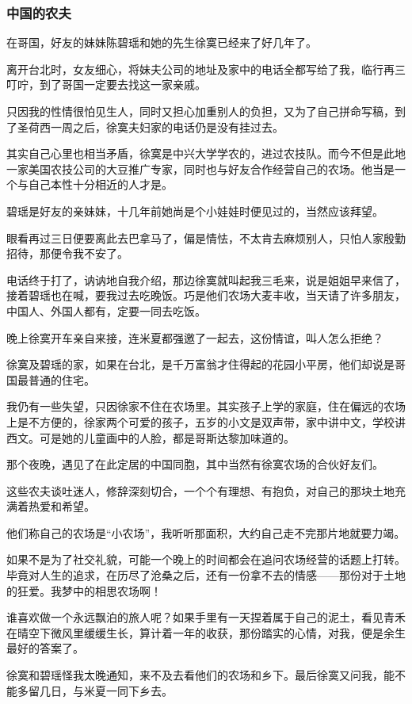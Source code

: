 \subsubsection*{中国的农夫}
\par 在哥国，好友的妹妹陈碧瑶和她的先生徐寞已经来了好几年了。
\par 离开台北时，女友细心，将妹夫公司的地址及家中的电话全都写给了我，临行再三叮咛，到了哥国一定要去找这一家亲戚。
\par 只因我的性情很怕见生人，同时又担心加重别人的负担，又为了自己拼命写稿，到了圣荷西一周之后，徐寞夫妇家的电话仍是没有挂过去。
\par 其实自己心里也相当矛盾，徐寞是中兴大学学农的，进过农技队。而今不但是此地一家美国农技公司的大豆推广专家，同时也与好友合作经营自己的农场。他当是一个与自己本性十分相近的人才是。
\par 碧瑶是好友的亲妹妹，十几年前她尚是个小娃娃时便见过的，当然应该拜望。
\par 眼看再过三日便要离此去巴拿马了，偏是情怯，不太肯去麻烦别人，只怕人家殷勤招待，那便令我不安了。
\par 电话终于打了，讷讷地自我介绍，那边徐寞就叫起我三毛来，说是姐姐早来信了，接着碧瑶也在喊，要我过去吃晚饭。巧是他们农场大麦丰收，当天请了许多朋友，中国人、外国人都有，定要一同去吃饭。
\par 晚上徐寞开车亲自来接，连米夏都强邀了一起去，这份情谊，叫人怎么拒绝？
\par 徐寞及碧瑶的家，如果在台北，是千万富翁才住得起的花园小平房，他们却说是哥国最普通的住宅。
\par 我仍有一些失望，只因徐家不住在农场里。其实孩子上学的家庭，住在偏远的农场上是不方便的，徐家两个可爱的孩子，五岁的小文是双声带，家中讲中文，学校讲西文。可是她的儿童画中的人脸，都是哥斯达黎加味道的。
\par 那个夜晚，遇见了在此定居的中国同胞，其中当然有徐寞农场的合伙好友们。
\par 这些农夫谈吐迷人，修辞深刻切合，一个个有理想、有抱负，对自己的那块土地充满着热爱和希望。
\par 他们称自己的农场是“小农场”，我听听那面积，大约自己走不完那片地就要力竭。
\par 如果不是为了社交礼貌，可能一个晚上的时间都会在追问农场经营的话题上打转。毕竟对人生的追求，在历尽了沧桑之后，还有一份拿不去的情感——那份对于土地的狂爱。我梦中的相思农场啊！
\par 谁喜欢做一个永远飘泊的旅人呢？如果手里有一天捏着属于自己的泥土，看见青禾在晴空下微风里缓缓生长，算计着一年的收获，那份踏实的心情，对我，便是余生最好的答案了。
\par 徐寞和碧瑶怪我太晚通知，来不及去看他们的农场和乡下。最后徐寞又问我，能不能多留几日，与米夏一同下乡去。
